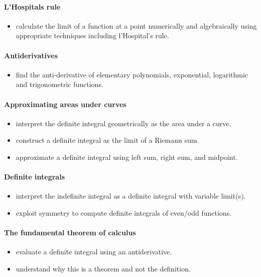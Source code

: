 \documentclass{amsart}
\begin{document}
\paragraph*{L'Hospitals rule}
\begin{itemize}
\item calculate the limit of a function at a point numerically and algebraically using
 appropriate techniques including l’Hospital’s rule.
\end{itemize}

\paragraph*{Antiderivatives}
\begin{itemize}
\item find the anti-derivative of elementary polynomials, exponential,
  logarithmic and trigonometric functions.
\end{itemize}

\paragraph*{Approximating areas under curves}
\begin{itemize}
\item interpret the definite integral geometrically as the area under a curve.
\item construct a definite integral as the limit of a Riemann sum.
\item approximate a definite integral using left sum, right sum, and
  midpoint.
\end{itemize}


\paragraph*{Definite integrals}
\begin{itemize}
\item interpret the indefinite integral as a definite integral with variable limit(s).
\item exploit symmetry to compute definite integrals of even/odd functions. 
\end{itemize}


\paragraph*{The fundamental theorem of calculus}
\begin{itemize}
\item evaluate a definite integral using an antiderivative.
\item understand why this is a theorem and not the definition.
\end{itemize}
\end{document}
